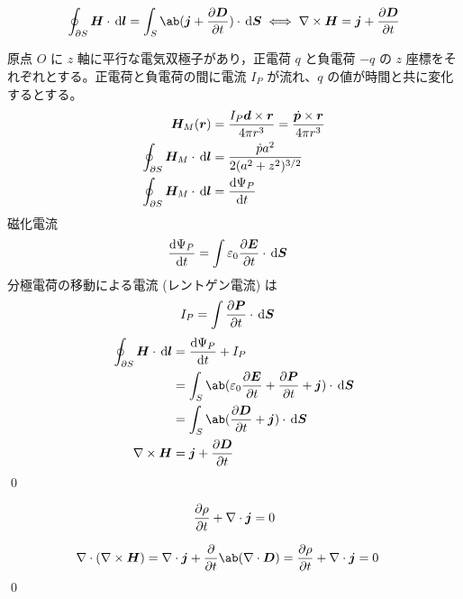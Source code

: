 \documentclass[uplatex,dvipdfmx,a4paper,11pt]{jlreq}
\makeatletter
\newcommand{\EE}{\bm{E}}
\newcommand{\DD}{\bm{D}}
\newcommand{\HH}{\bm{H}}
\newcommand{\PP}{\bm{P}}
\newcommand{\rr}{\bm{r}}
\newcommand{\pp}{\bm{p}}
\renewcommand{\SS}{\bm{S}}
\newcommand{\vnabla}{\mathbf{\nabla}}
\numberwithin{equation}{section}
\theoremstyle{definition}
\renewenvironment{proof}[1][\proofname]{\par
  \normalfont
  \topsep6\p@\@plus6\p@ \trivlist
  \item[\hskip\labelsep{\bfseries #1}\@addpunct{\bfseries}]\ignorespaces\quad\par
}{%
  \qed\endtrivlist\@endpefalse
}
\renewcommand\proofname{証明}
\makeatother
\begin{document}
\begin{theorem}
  \begin{align}
    \oint_{\partial S}\HH\cdot\dl{\bm{l}} = \int_S\ab(\bm{j} + \diffp{\DD}{t})\cdot\dl{\SS} \iff \vnabla\times\HH = \bm{j} + \diffp{\DD}{t}
  \end{align}
\end{theorem}
\begin{proof}
  原点 $O$ に $z$ 軸に平行な電気双極子があり，正電荷 $q$ と負電荷 $-q$ の $z$ 座標をそれぞれとする。正電荷と負電荷の間に電流 $I_P$ が流れ、$q$ の値が時間と共に変化するとする。
  \begin{align}
    \HH_M(\rr)                              & = \frac{I_P\bm{d}\times\rr}{4\pi r^3} = \frac{\dot{\pp}\times\rr}{4\pi r^3} \\
    \oint_{\partial S}\HH_M\cdot\dl{\bm{l}} & = \frac{\dot{p}a^2}{2(a^2 + z^2)^{3/2}}                                     \\
    \oint_{\partial S}\HH_M\cdot\dl{\bm{l}} & = \diff{\Psi_P}{t}
  \end{align}
  磁化電流
  \begin{align}
    \diff{\Psi_P}{t} & = \int\varepsilon_0\diffp{\EE}{t}\cdot\dl{\SS}
  \end{align}
  分極電荷の移動による電流 (レントゲン電流) は
  \begin{align}
    I_P & = \int\diffp{\PP}{t}\cdot\dl{\SS}
  \end{align}
  \begin{align}
    \oint_{\partial S}\HH\cdot\dl{\bm{l}} & = \diff{\Psi_P}{t} + I_P                                                        \\
                                          & = \int_S\ab(\varepsilon_0\diffp{\EE}{t} + \diffp{\PP}{t} + \bm{j})\cdot\dl{\SS} \\
                                          & = \int_S\ab(\diffp{\DD}{t} + \bm{j})\cdot\dl{\SS}                               \\
    \vnabla\times\HH                      & = \bm{j} + \diffp{\DD}{t}
  \end{align}
\end{proof}

\begin{theorem}[電荷の保存則]
  \begin{align}
    \diffp{\rho}{t} + \vnabla\cdot\bm{j} = 0
  \end{align}
\end{theorem}
\begin{proof}
  \begin{align}
    \vnabla\cdot(\vnabla\times\HH) & = \vnabla\cdot\bm{j} + \diffp{}{t}\ab(\vnabla\cdot\DD) = \diffp{\rho}{t} + \vnabla\cdot\bm{j} = 0
  \end{align}
\end{proof}
\end{document}
